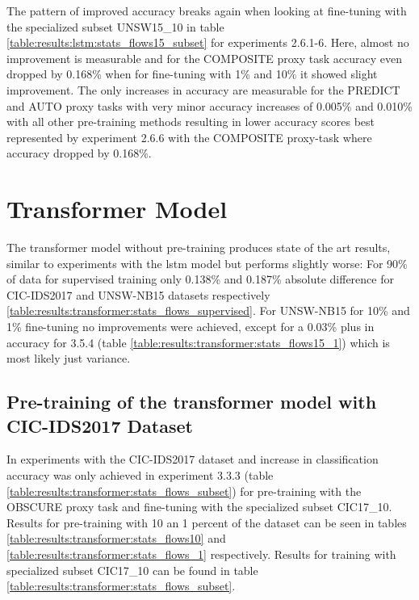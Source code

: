 

The pattern of improved accuracy breaks again when looking at fine-tuning with the specialized subset UNSW15\_10 in table \ref{table:results:lstm:stats_flows15_subset} for experiments 2.6.1-6. Here, almost no improvement is measurable and for the COMPOSITE proxy task accuracy even dropped by 0.168\% when for fine-tuning with 1\% and 10\% it showed slight improvement. The only increases in accuracy are measurable for the PREDICT and AUTO proxy tasks with very minor accuracy increases of 0.005\% and 0.010\% with all other pre-training methods resulting in lower accuracy scores best represented by experiment 2.6.6 with the COMPOSITE proxy-task where accuracy dropped by 0.168\%. \par



\FloatBarrier

\clearpage

\section{Transformer Model} \label{sec:results:transformer}

The transformer model without pre-training produces state of the art results, similar to experiments with the \gls{lstm} model but  performs slightly worse: For 90\% of data for supervised training only 0.138\% and 0.187\% absolute difference for CIC-IDS2017 and UNSW-NB15 datasets respectively \ref{table:results:transformer:stats_flows_supervised}.
For UNSW-NB15 for 10\% and 1\% fine-tuning no improvements were achieved, except for a 0.03\% plus in accuracy for 3.5.4 (table \ref{table:results:transformer:stats_flows15_1}) which is most likely just variance. \par





\subsection{Pre-training of the transformer model with CIC-IDS2017 Dataset}

In experiments with the CIC-IDS2017 dataset and increase in classification accuracy was only achieved in experiment 
3.3.3 (table \ref{table:results:transformer:stats_flows_subset}) for pre-training with the OBSCURE proxy task and fine-tuning with the specialized subset CIC17\_10. Results for pre-training with 10 an 1 percent of the dataset can be seen in tables \ref{table:results:transformer:stats_flows10} and \ref{table:results:transformer:stats_flows_1} respectively. Results for training with specialized subset CIC17\_10 can be found in table \ref{table:results:transformer:stats_flows_subset}.

